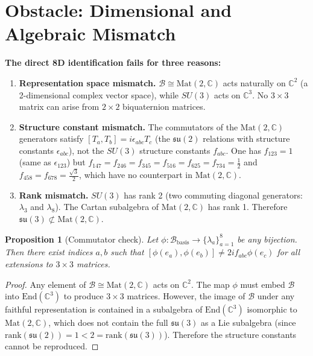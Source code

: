 \documentclass[12pt,a4paper]{article}
\newtheorem{proposition}[theorem]{Proposition}
\theoremstyle{definition}
\theoremstyle{remark}
\begin{document}
\section{Obstacle: Dimensional and Algebraic Mismatch}
\label{sec:obstacle}

\begin{gapbox}
\textbf{The direct 8D identification fails for three reasons:}

\begin{enumerate}
  \item \textbf{Representation space mismatch.}
    $\mathcal{B} \cong \mathrm{Mat}(2,\mathbb{C})$ acts naturally on $\mathbb{C}^2$
    (a 2-dimensional complex vector space), while $SU(3)$ acts on $\mathbb{C}^3$.
    No $3\times 3$ matrix can arise from $2\times 2$ biquaternion matrices.

  \item \textbf{Structure constant mismatch.}
    The commutators of the $\mathrm{Mat}(2,\mathbb{C})$ generators satisfy
    $[T_a, T_b] = i\epsilon_{abc}T_c$ (the $\mathfrak{su}(2)$ relations with
    structure constants $\epsilon_{abc}$), not the $SU(3)$ structure constants
    $f_{abc}$.  One has $f_{123} = 1$ (same as $\epsilon_{123}$) but
    $f_{147} = f_{246} = f_{345} = f_{516} = f_{625} = f_{734} = \tfrac{1}{2}$
    and $f_{458} = f_{678} = \tfrac{\sqrt{3}}{2}$, which have no counterpart
    in $\mathrm{Mat}(2,\mathbb{C})$.

  \item \textbf{Rank mismatch.}
    $SU(3)$ has rank 2 (two commuting diagonal generators: $\lambda_3$ and
    $\lambda_8$).  The Cartan subalgebra of $\mathrm{Mat}(2,\mathbb{C})$ has
    rank 1.  Therefore $\mathfrak{su}(3) \not\subset \mathrm{Mat}(2,\mathbb{C})$.
\end{enumerate}
\end{gapbox}

\begin{proposition}[Commutator check]
\label{prop:comm}
Let $\phi\colon \mathcal{B}_{\mathrm{basis}} \to \{\lambda_a\}_{a=1}^8$ be
any bijection.  Then there exist indices $a, b$ such that
$[\phi(e_a), \phi(e_b)] \neq 2if_{abc}\phi(e_c)$ for all extensions
to $3\times 3$ matrices.
\end{proposition}

\begin{proof}
Any element of $\mathcal{B} \cong \mathrm{Mat}(2,\mathbb{C})$ acts on
$\mathbb{C}^2$.  The map $\phi$ must embed $\mathcal{B}$ into
$\mathrm{End}(\mathbb{C}^3)$ to produce $3\times 3$ matrices.
However, the image of $\mathcal{B}$ under any faithful representation
is contained in a subalgebra of $\mathrm{End}(\mathbb{C}^3)$ isomorphic
to $\mathrm{Mat}(2,\mathbb{C})$, which does not contain the full
$\mathfrak{su}(3)$ as a Lie subalgebra (since $\mathrm{rank}(\mathfrak{su}(2)) = 1
< 2 = \mathrm{rank}(\mathfrak{su}(3))$).  Therefore the structure
constants cannot be reproduced.
\end{proof}
\end{document}
